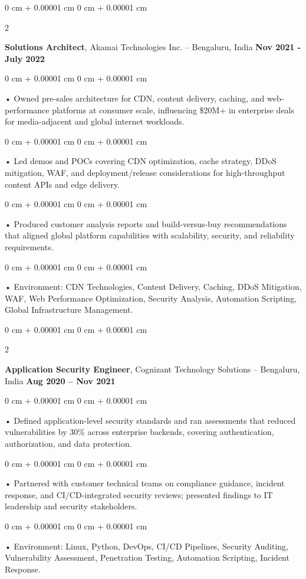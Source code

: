 \documentclass[10pt, letterpaper]{article}
\newenvironment{onecolentry}{
    \begin{adjustwidth}{
        0 cm + 0.00001 cm
    }{
        0 cm + 0.00001 cm
    }
}{
    \end{adjustwidth}
} %
\newenvironment{twocolentry}[2][]{
    \onecolentry
    \def\secondColumn{#2}
    \setcolumnwidth{\fill, 4.5 cm}
    \begin{paracol}{2}
}{
    \switchcolumn \raggedleft \secondColumn
    \end{paracol}
    \endonecolentry
} %
\begin{document}
        \begin{twocolentry}{
            \textbf{Nov 2021 - July 2022}
        }
            \textbf{Solutions Architect}, Akamai Technologies Inc. -- Bengaluru, India \end{twocolentry}
        \begin{onecolentry}
            • Owned pre-sales architecture for CDN, content delivery, caching, and web-performance platforms at consumer scale, influencing \$20M+ in enterprise deals for media-adjacent and global internet workloads.
        \end{onecolentry}
        \begin{onecolentry}
            • Led demos and POCs covering CDN optimization, cache strategy, DDoS mitigation, WAF, and deployment/release considerations for high-throughput content APIs and edge delivery.
        \end{onecolentry}
        \begin{onecolentry}
             • Produced customer analysis reports and build-versus-buy recommendations that aligned global platform capabilities with scalability, security, and reliability requirements.
        \end{onecolentry}
        \begin{onecolentry}
             • Environment: CDN Technologies, Content Delivery, Caching, DDoS Mitigation, WAF, Web Performance Optimization, Security Analysis, Automation Scripting, Global Infrastructure Management.
        \end{onecolentry}

        \begin{twocolentry}{
            \textbf{Aug 2020 – Nov 2021}
        }
            \vspace{2 pt }
            \textbf{Application Security Engineer}, Cognizant Technology Solutions -- Bengaluru, India\end{twocolentry}
        \begin{onecolentry}
             • Defined application-level security standards and ran assessments that reduced vulnerabilities by 30\% across enterprise backends, covering authentication, authorization, and data protection.
        \end{onecolentry}
        \begin{onecolentry}
             • Partnered with customer technical teams on compliance guidance, incident response, and CI/CD-integrated security reviews; presented findings to IT leadership and security stakeholders.
        \end{onecolentry}
        \begin{onecolentry}
             • Environment: Linux, Python, DevOps, CI/CD Pipelines, Security Auditing, Vulnerability Assessment, Penetration Testing, Automation Scripting, Incident Response.
        \end{onecolentry}
    \vspace{2 pt }
\end{document}
